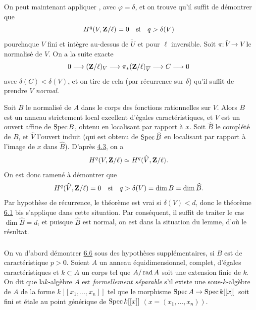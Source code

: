 \documentclass[10pt]{../fichiers-configuration-latex/smfart}
\begin{document}
On peut maintenant appliquer , avec $\varphi=\delta$, et on
trouve qu'il suffit de démontrer que
$$
H^{q}(V,\mathbf{Z}/\ell)=0\quad\text{\rm si}\quad q>\delta(V)
$$
pour\pageoriginale chaque $V$ fini et intègre au-dessus de
$\widetilde{U}$ et pour $\ell$ inversible. Soit $\pi:\bar{V}\rightarrow
V$ le normalisé de $V$. On a la suite exacte
$$
0\longrightarrow (\mathbf{Z}/\ell)_{V}\longrightarrow
\pi_{\ast}(\mathbf{Z}/\ell)_{\overline{V}}\longrightarrow C\longrightarrow 0
$$
avec $\delta(C)<\delta(V)$, et on tire de cela (par récurrence sur
$\delta$) qu'il suffit de prendre $V$ \emph{normal}.

Soit $B$ le normalisé de $A$ dans le corps des fonctions rationnelles
sur $V$. Alors $B$ est un anneau strictement local excellent d'égales
caractéristiques, et $V$ est un ouvert affine de $\operatorname{Spec} B$, obtenu en
localisant par rapport à $x$. Soit $\hat{B}$ le complété de $B$, et
$\hat{V}$ l'ouvert induit (qui est obtenu de $\operatorname{Spec} \widehat{B}$ en
localisant par rapport à l'image de $x$ dans $\hat{B}$). D'après \hyperref[XIX.cor4.3]{4.3},
on a
$$
H^{q}(V,\mathbf{Z}/\ell)\simeq H^{q}(\widehat{V},\mathbf{Z}/\ell){}.
$$
On est donc ramené à démontrer que
$$
H^{q}(\widehat{V},\mathbf{Z}/\ell)=0\quad\text{\rm si}\quad q>\delta
(V)=\dim B=\dim \widehat{B}{}.
$$
Par hypothèse de récurrence, le théorème est vrai si $\delta(V)<d$,
donc le théorème \hyperref[XIX.thm6.1]{6.1} bis s'applique dans cette situation. Par
conséquent, il suffit de traiter le cas $\dim \hat{B}=d$, et puisque
$\hat{B}$ est normal, on est dans la situation du lemme, d'où le
résultat.

\setcounter{subsection}{7}
\setcounter{subsubsection}{-1}
\subsubsection{}
On va d'abord démontrer \hyperref[XIX.lem6.6]{6.6} sous des hypothèses
supplémentaires, si 
$B$ est de caractéristique $p>0$. Soient $A$ un anneau
équidimensionnel, complet, d'égales caractéristiques et $k\subset A$ un
corps tel que $A/\operatorname{rad} A$ soit une extension finie de $k$. On dit que
la\pageoriginale $k$-algèbre $A$ est \emph{formellement séparable}
s'il existe une sous-$k$-algèbre de $A$ de la forme
$k[[x_{1},\ldots,x_{n}]]$ tel que le morphisme $\operatorname{Spec} A\rightarrow
\operatorname{Spec} k[[x]]$ soit fini et étale au point générique de $\operatorname{Spec} k[[x]]$
$(x=(x_{1},\ldots,x_{n}))$.
\end{document}
